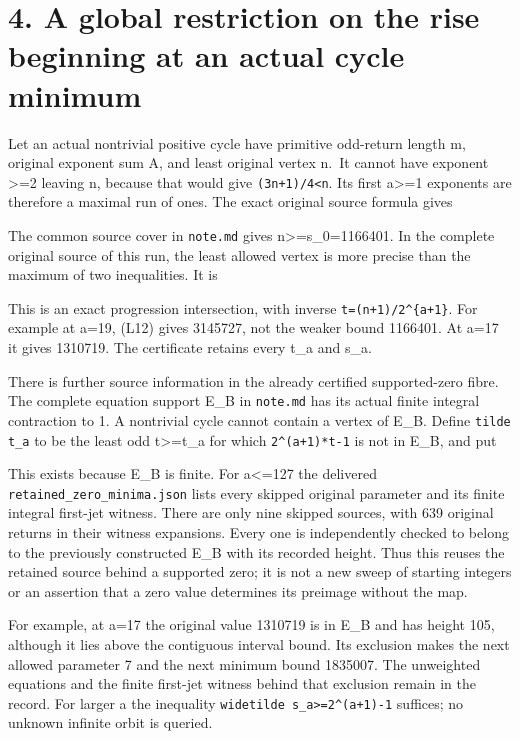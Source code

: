 \section{4. A global restriction on the rise beginning at an actual
cycle minimum}

Let an actual nontrivial positive cycle have primitive odd-return length
m, original exponent sum A, and least original vertex n.~It cannot have
exponent \textgreater=2 leaving n, because that would give
\nolinkurl{(3n+1)/4<n}. Its first a\textgreater=1 exponents are
therefore a maximal run of ones. The exact original source formula gives


The common source cover in \nolinkurl{note.md} gives
n\textgreater=s\_0=1166401. In the complete original source of this run,
the least allowed vertex is more precise than the maximum of two
inequalities. It is


This is an exact progression intersection, with inverse
\texttt{t=(n+1)/2\^{}\{a+1\}}. For example at a=19, (L12) gives 3145727,
not the weaker bound 1166401. At a=17 it gives 1310719. The certificate
retains every t\_a and s\_a.

There is further source information in the already certified
supported-zero fibre. The complete equation support E\_B in
\nolinkurl{note.md} has its actual finite integral contraction to 1. A
nontrivial cycle cannot contain a vertex of E\_B. Define
\nolinkurl{tilde t_a} to be the least odd t\textgreater=t\_a for which
\nolinkurl{2^(a+1)*t-1} is not in E\_B, and put


This exists because E\_B is finite. For a\textless=127 the delivered
\nolinkurl{retained_zero_minima.json} lists every skipped original
parameter and its finite integral first-jet witness. There are only nine
skipped sources, with 639 original returns in their witness expansions.
Every one is independently checked to belong to the previously
constructed E\_B with its recorded height. Thus this reuses the retained
source behind a supported zero; it is not a new sweep of starting
integers or an assertion that a zero value determines its preimage
without the map.

For example, at a=17 the original value 1310719 is in E\_B and has
height 105, although it lies above the contiguous interval bound. Its
exclusion makes the next allowed parameter 7 and the next minimum bound
1835007. The unweighted equations and the finite first-jet witness
behind that exclusion remain in the record. For larger a the inequality
\nolinkurl{widetilde s_a>=2^(a+1)-1} suffices; no unknown infinite orbit
is queried.

